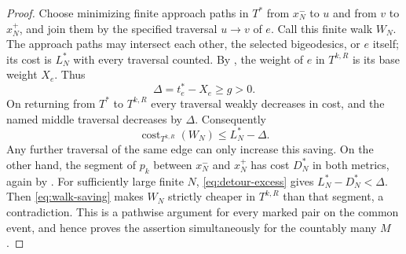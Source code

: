 \begin{proof}
Choose minimizing finite approach paths in $T^*$ from $x_N^-$ to $u$
and from $v$ to $x_N^+$, and join them by the specified traversal
$u\to v$ of $e$.  Call this finite walk $W_N$.  The approach paths
may intersect each other, the selected bigeodesics, or $e$ itself;
its cost is $L_N^*$ with every traversal counted.
By , the weight of $e$ in $T^{k,R}$ is its base weight
$X_e$.  Thus
\[
 \Delta=t_e^*-X_e\geq g>0.
\]
On returning from $T^*$ to $T^{k,R}$ every traversal weakly decreases
in cost, and the named middle traversal decreases by $\Delta$.
Consequently
\begin{equation}\label{eq:walk-saving}
 \operatorname{cost}_{T^{k,R}}(W_N)\leq L_N^*-\Delta.
\end{equation}
Any further traversal of the same edge can only increase this saving.
On the other hand, the segment of $p_k$ between $x_N^-$ and $x_N^+$
has cost $D_N^*$ in both metrics, again by .
For sufficiently large finite $N$, \eqref{eq:detour-excess} gives
$L_N^*-D_N^*<\Delta$.  Then \eqref{eq:walk-saving} makes $W_N$ strictly cheaper in
$T^{k,R}$ than that segment, a contradiction.  This is a pathwise
argument for every marked pair on the common event, and hence proves
the assertion simultaneously for the countably many $M$.
\end{proof}
